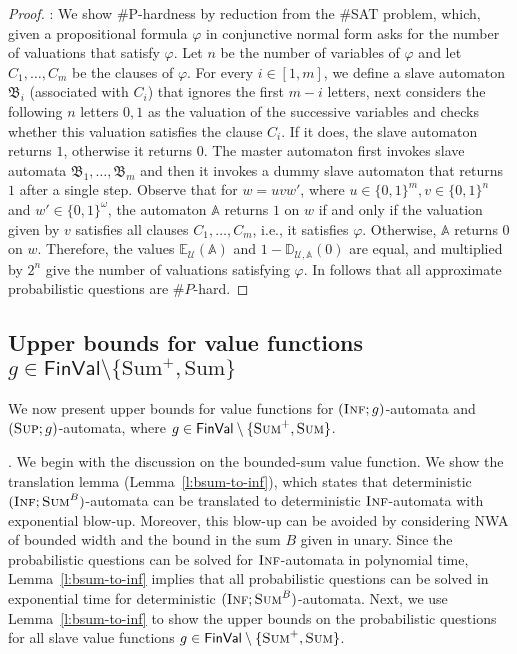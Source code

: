 \documentclass{lmcs}
\newcommand{\Paragraph}[1]{\noindent{\textbf{#1}}}
\newcommand{\nestedA}{\mathbb{A}}
\newcommand{\slaveA}{{\mathfrak{B}}}
\newcommand{\fsum}{\textsc{Sum}}
\newcommand{\fBsum}[1]{\textsc{Sum}^{#1}}
\newcommand{\fsup}{\textsc{Sup}}
\newcommand{\finf}{\textsc{Inf}}
\newcommand{\FinVal}{\mathsf{FinVal}}
\newcommand{\expected}{\mathbb{E}}
\newcommand{\distrib}{\mathbb{D}}
\newcommand{\calU}{\mathcal{U}}
\begin{document}
\begin{proof}
\Paragraph{$\#P$-hardness}:
We show \#P-hardness by reduction from the \#SAT problem, which, given a propositional formula $\varphi$ in conjunctive normal form
asks for the number of valuations that satisfy $\varphi$.
Let $n$ be the number of variables of $\varphi$ and let $C_1, \ldots, C_m$ be the clauses of $\varphi$.
For every $i \in [1,m]$, we define a slave automaton $\slaveA_i$ (associated with $C_i$) that ignores the first $m-i$ letters, next
considers the following $n$ letters $0,1$ as the valuation of the successive variables and checks
whether this valuation satisfies the clause $C_i$. If it does, the slave automaton returns $1$, otherwise it returns $0$.
The master automaton first invokes slave automata $\slaveA_1, \ldots, \slaveA_m$ and then it invokes
a dummy slave automaton that returns $1$ after a single step.
Observe that for $w = uvw'$, where $u \in {\{0,1\}}^m, v \in {\{0,1\}}^n$ and $w' \in {\{0,1\}}^{\omega}$,
the automaton $\nestedA$ returns $1$ on $w$ if and only if the valuation given by $v$ satisfies
all clauses $C_1, \ldots, C_m$, i.e., it satisfies $\varphi$.
Otherwise, $\nestedA$ returns $0$ on $w$.
Therefore, the values $\expected_{\calU}(\nestedA)$ and $1 - \distrib_{\calU, \nestedA}(0)$
 are equal, and multiplied by $2^{n}$ give the number of valuations satisfying $\varphi$.
In follows that all approximate probabilistic questions are $\#P$-hard.
\end{proof}


\subsection{Upper bounds for value functions \texorpdfstring{$g\in  \FinVal \setminus \{ \text{Sum}^+,\text{Sum} \}$}{g in FinVal\textbackslash\{ Sum+, Sum \}}}
We now present upper bounds for value functions
for $(\finf;g)$-automata and $(\fsup;g)$-automata, where $g \in  \FinVal \setminus \{ \fsum^+,\fsum \}$.

\Paragraph{Overview}.
We begin with the discussion on the bounded-sum value function.
We show the translation lemma (Lemma~\ref{l:bsum-to-inf}), which states that deterministic $(\finf; \fBsum{B})$-automata
can be translated to deterministic $\finf$-automata with exponential blow-up. Moreover, this blow-up can be avoided
by considering NWA of bounded width and the bound in the sum $B$ given in unary.
Since the probabilistic questions can be solved for
$\finf$-automata in polynomial time, Lemma~\ref{l:bsum-to-inf} implies that all probabilistic
questions can be solved in exponential time for deterministic $(\finf; \fBsum{B})$-automata.
Next, we use Lemma~\ref{l:bsum-to-inf} to show the upper bounds on the probabilistic questions for all slave value functions $g\in  \FinVal \setminus \{ \fsum^+,\fsum \}$.
\end{document}
